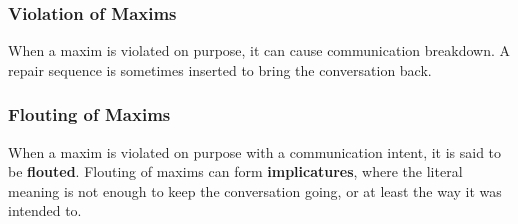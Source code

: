 \documentclass[../main.tex]{subfiles}
\begin{document}
		\subsubsection{Violation of Maxims}
		When a maxim is violated on purpose, it can cause communication breakdown. A repair sequence is sometimes inserted to bring the conversation back.

		\subsubsection{Flouting of Maxims}
		When a maxim is violated on purpose with a communication intent, it is said to be \textbf{flouted}. Flouting of maxims can form \textbf{implicatures}, where the literal meaning is not enough to keep the conversation going, or at least the way it was intended to.
\end{document}
